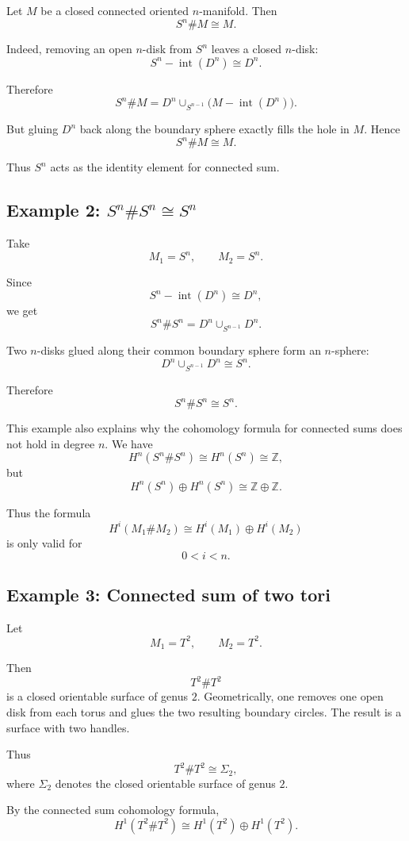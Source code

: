\documentclass[12pt,a4paper]{article}
\theoremstyle{notespace}
\begin{document}
Let \(M\) be a closed connected oriented \(n\)-manifold. Then
\[
S^n\#M\cong M.
\]

Indeed, removing an open \(n\)-disk from \(S^n\) leaves a closed \(n\)-disk:
\[
S^n-\operatorname{int}(D^n)\cong D^n.
\]

Therefore
\[
S^n\#M
=
D^n\cup_{S^{n-1}}\bigl(M-\operatorname{int}(D^n)\bigr).
\]

But gluing \(D^n\) back along the boundary sphere exactly fills the hole in
\(M\). Hence
\[
\boxed{S^n\#M\cong M.}
\]

Thus \(S^n\) acts as the identity element for connected sum.

\subsection{Example 2: \texorpdfstring{$S^n\# S^n \cong S^n$}{Sn connected sum Sn = Sn}}

Take
\[
M_1=S^n,
\qquad
M_2=S^n.
\]

Since
\[
S^n-\operatorname{int}(D^n)\cong D^n,
\]
we get
\[
S^n\#S^n
=
D^n\cup_{S^{n-1}}D^n.
\]

Two \(n\)-disks glued along their common boundary sphere form an \(n\)-sphere:
\[
D^n\cup_{S^{n-1}}D^n\cong S^n.
\]

Therefore
\[
\boxed{S^n\#S^n\cong S^n.}
\]

This example also explains why the cohomology formula for connected sums does
not hold in degree \(n\). We have
\[
H^n(S^n\#S^n)
\cong
H^n(S^n)
\cong
\mathbb{Z},
\]
but
\[
H^n(S^n)\oplus H^n(S^n)
\cong
\mathbb{Z}\oplus \mathbb{Z}.
\]

Thus the formula
\[
H^i(M_1\#M_2)
\cong
H^i(M_1)\oplus H^i(M_2)
\]
is only valid for
\[
0<i<n.
\]

\subsection{Example 3: Connected sum of two tori}

Let
\[
M_1=T^2,
\qquad
M_2=T^2.
\]

Then
\[
T^2\#T^2
\]
is a closed orientable surface of genus \(2\). Geometrically, one removes one
open disk from each torus and glues the two resulting boundary circles. The
result is a surface with two handles.

Thus
\[
\boxed{T^2\#T^2\cong \Sigma_2,}
\]
where \(\Sigma_2\) denotes the closed orientable surface of genus \(2\).

By the connected sum cohomology formula,
\[
H^1(T^2\#T^2)
\cong
H^1(T^2)\oplus H^1(T^2).
\]
\end{document}
